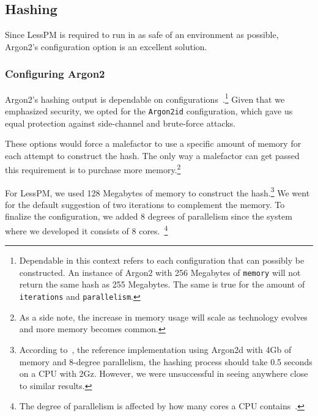 \subsection{Hashing}\label{subsec:hashing}

Since LessPM is required to run in as safe of an environment as possible,
Argon2's configuration option is an excellent solution.

\subsubsection{Configuring Argon2}
Argon2's hashing output is dependable on
configurations~\cite{argon2specs}.\footnote{
  Dependable in this context refers to each configuration that can
  possibly be constructed.
  An instance of Argon2 with 256 Megabytes of \texttt{memory} will not return
  the same hash as 255 Megabytes.
  The same is true for the amount of \texttt{iterations} and
  \texttt{parallelism}.
}
Given that we emphasized security, we opted for the \texttt{Argon2id}
configuration, which gave us equal protection against side-channel and
brute-force attacks.

These options would force a malefactor to use a specific amount of memory for
each attempt to construct the hash.
The only way a malefactor can get passed this requirement is to purchase more
memory.\footnote{
  As a side note, the increase in memory usage will scale as technology evolves
  and more memory becomes common.
}

For LessPM, we used 128 Megabytes of memory to construct the hash.\footnote{
  According to~\cite{argon2specs}, the reference implementation using Argon2d
  with 4Gb of memory and 8-degree parallelism, the hashing process should take
  0.5 seconds on a CPU with 2Gz. However, we were unsuccessful in seeing
  anywhere close to similar results.
}
We went for the default suggestion of two iterations to complement the memory.
To finalize the configuration, we added 8 degrees of parallelism since the
system where we developed it consists of 8 cores.~\footnote{
  The degree of parallelism is affected by how many cores a CPU
  contains~\cite{argon2specs}.
}

